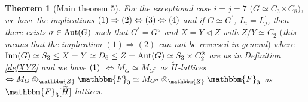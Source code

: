 \documentclass{amsart}
\theoremstyle{plain}
\newtheorem{theorem}{Theorem}[section]
\theoremstyle{definition}
\theoremstyle{remark}
\newcommand{\bZ}{\mathbbm{Z}}\newcommand{\bQ}{\mathbbm{Q}}
\newcommand{\bF}{\mathbbm{F}}\newcommand{\bP}{\mathbbm{P}}
\newcommand{\GL}{{\rm GL}}\newcommand{\SL}{{\rm SL}}
\begin{document}
\begin{theorem}[Main theorem 5]
For the exceptional case  $i=j=7$ $($$G\simeq C_3\rtimes C_8$$)$, 
we have the implications 
${\rm (1)}\Rightarrow {\rm (2)}\Leftrightarrow {\rm (3)}
\Leftrightarrow {\rm (4)}$ and if $G\simeq G^\prime$, $L_i=L_j^\prime$, then 
there exists $\sigma\in {\rm Aut}(G)$ such that $G^\prime=G^\sigma$ 
and $X=Y\lhd Z$ with $Z/Y\simeq C_2$ 
$($this means that the implication $(1)\Rightarrow (2)$ 
can not be reversed in general$)$ 
where ${\rm Inn}(G)\simeq S_3\leq X=Y\simeq D_6\leq Z={\rm Aut}(G)\simeq S_3\times C_2^2$ 
are as in Definition \ref{defXYZ} 
%
and we have 
${\rm (1)}$ 
$\Leftrightarrow M_G\simeq M_{G^\sigma}$ as $\widetilde{H}$-lattices 
$\Leftrightarrow M_G\otimes_\bZ \bF_3\simeq M_{G^\sigma}\otimes_\bZ \bF_3$ 
as $\bF_3[\widetilde{H}]$-lattices.  


\end{theorem}
\end{document}
